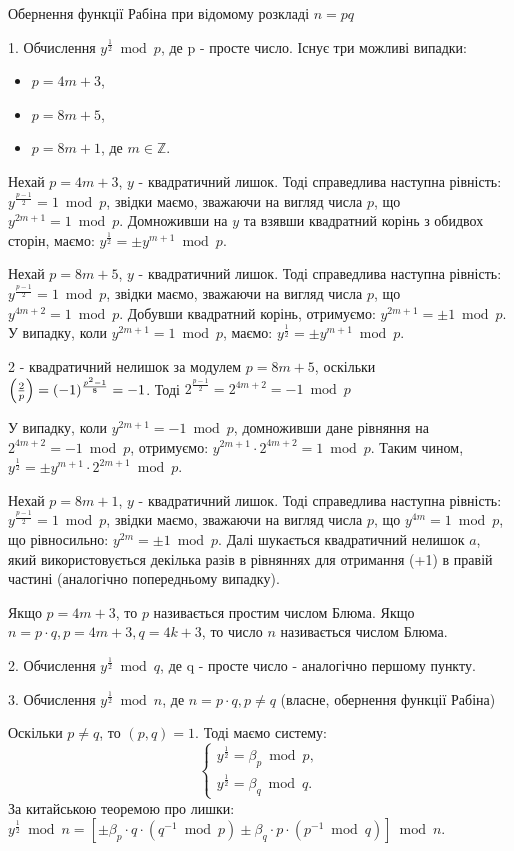 \begin{algorithm}{Обернення функції Рабіна при відомому розкладі $n = pq$}
\par1. Обчислення $y ^{\frac{1}{2}} \bmod p$, де p - просте число.
Існує три можливі випадки:
\begin{itemize}
        \item $p=4m+3$,
        \item $p=8m+5$,
        \item $p=8m+1$, де $m \in \mathbb{Z}$.
\end{itemize}

Нехай $p=4m+3$, $y$ - квадратичний лишок. Тоді справедлива наступна рівність: $y^{\frac{p-1}{2}}=1 \bmod p$, звідки маємо, зважаючи на вигляд числа $p$, що $y^{2m+1}=1 \bmod p$. Домноживши на $y$ та взявши квадратний корінь з обидвох сторін, маємо: $y ^{\frac{1}{2}} = \pm y^{m+1} \bmod p$.

Нехай $p=8m+5$, $y$ - квадратичний лишок. Тоді справедлива наступна рівність: $y^{\frac{p-1}{2}}=1 \bmod p$, звідки маємо, зважаючи на вигляд числа $p$, що $y^{4m+2}=1 \bmod p$. Добувши квадратний корінь, отримуємо: $y^{2m+1}= \pm 1 \bmod p$. У випадку, коли $y^{2m+1}=1 \bmod p$, маємо: $y ^{\frac{1}{2}} = \pm y^{m+1} \bmod p$. 
\begin{remark}
2 - квадратичний нелишок за модулем $p=8m+5$, оскільки $\left(\frac{2}{p}\right) = (-1)^{\frac{p^2-1}{8}}=-1$. Тоді $2^{\frac{p-1}{2}}=2^{4m+2}=-1\bmod p$
\end{remark}
У випадку, коли $y^{2m+1}=-1 \bmod p$, домноживши дане рівняння на $2^{4m+2}=-1\bmod p$, отримуємо: $y^{2m+1} \cdot 2^{4m+2}=1 \bmod p$. Таким чином, $y ^{\frac{1}{2}} = \pm y^{m+1} \cdot 2^{2m+1} \bmod p$.

Нехай $p=8m+1$, $y$ - квадратичний лишок. Тоді справедлива наступна рівність: $y^{\frac{p-1}{2}}=1 \bmod p$, звідки маємо, зважаючи на вигляд числа $p$, що $y^{4m}=1 \bmod p$, що рівносильно: $y^{2m}= \pm 1 \bmod p$. Далі шукається квадратичний нелишок $a$, який використовується декілька разів в рівняннях для отримання (+1) в правій частині (аналогічно попередньому випадку).

\begin{remark}
Якщо $p=4m+3$, то $p$ називається простим числом Блюма. Якщо $n = p \cdot q, p=4m+3, q=4k+3$, то число $n$ називається числом Блюма.
\end{remark}

\par2. Обчислення $y ^{\frac{1}{2}} \bmod q$, де q - просте число - аналогічно першому пункту.

\par3. Обчислення $y ^{\frac{1}{2}} \bmod n$, де $n = p \cdot q, p\neq q$ (власне, обернення функції Рабіна)

Оскільки $p\neq q$, то $(p, q) = 1$. Тоді маємо систему:
\begin{equation*}
\begin{cases}
y^{\frac{1}{2}}=\beta_p \bmod p,\\
y^{\frac{1}{2}}=\beta_q \bmod q.
\end{cases}
\end{equation*}
За китайською теоремою про лишки: $y^{\frac{1}{2}} \bmod n = [\pm\beta_p \cdot q \cdot (q^{-1}\bmod p) \pm \beta_q \cdot p \cdot(p^{-1} \bmod q)]\bmod n$.
\end{algorithm}

